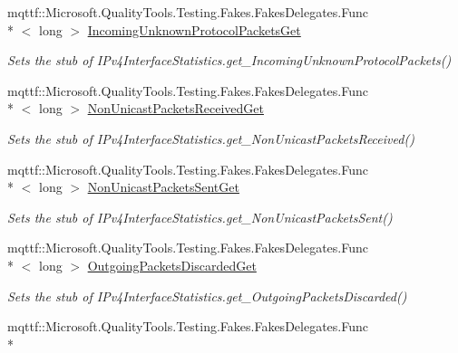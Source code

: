\begin{DoxyCompactItemize}
mqttf\-::\-Microsoft.\-Quality\-Tools.\-Testing.\-Fakes.\-Fakes\-Delegates.\-Func\\*
$<$ long $>$ \hyperlink{class_system_1_1_net_1_1_network_information_1_1_fakes_1_1_stub_i_pv4_interface_statistics_ab0469bad3b76c60984072b0f48381be6}{Incoming\-Unknown\-Protocol\-Packets\-Get}
\begin{DoxyCompactList}\small\item\em Sets the stub of I\-Pv4\-Interface\-Statistics.\-get\-\_\-\-Incoming\-Unknown\-Protocol\-Packets()\end{DoxyCompactList}\item 
mqttf\-::\-Microsoft.\-Quality\-Tools.\-Testing.\-Fakes.\-Fakes\-Delegates.\-Func\\*
$<$ long $>$ \hyperlink{class_system_1_1_net_1_1_network_information_1_1_fakes_1_1_stub_i_pv4_interface_statistics_a63412fccaa25872a5003b32712235284}{Non\-Unicast\-Packets\-Received\-Get}
\begin{DoxyCompactList}\small\item\em Sets the stub of I\-Pv4\-Interface\-Statistics.\-get\-\_\-\-Non\-Unicast\-Packets\-Received()\end{DoxyCompactList}\item 
mqttf\-::\-Microsoft.\-Quality\-Tools.\-Testing.\-Fakes.\-Fakes\-Delegates.\-Func\\*
$<$ long $>$ \hyperlink{class_system_1_1_net_1_1_network_information_1_1_fakes_1_1_stub_i_pv4_interface_statistics_a8faabf45c61a8c042e75a6d63f782978}{Non\-Unicast\-Packets\-Sent\-Get}
\begin{DoxyCompactList}\small\item\em Sets the stub of I\-Pv4\-Interface\-Statistics.\-get\-\_\-\-Non\-Unicast\-Packets\-Sent()\end{DoxyCompactList}\item 
mqttf\-::\-Microsoft.\-Quality\-Tools.\-Testing.\-Fakes.\-Fakes\-Delegates.\-Func\\*
$<$ long $>$ \hyperlink{class_system_1_1_net_1_1_network_information_1_1_fakes_1_1_stub_i_pv4_interface_statistics_a563acb8769d636b6751fb11d1f65734f}{Outgoing\-Packets\-Discarded\-Get}
\begin{DoxyCompactList}\small\item\em Sets the stub of I\-Pv4\-Interface\-Statistics.\-get\-\_\-\-Outgoing\-Packets\-Discarded()\end{DoxyCompactList}\item 
mqttf\-::\-Microsoft.\-Quality\-Tools.\-Testing.\-Fakes.\-Fakes\-Delegates.\-Func\\*

\end{DoxyCompactItemize}
